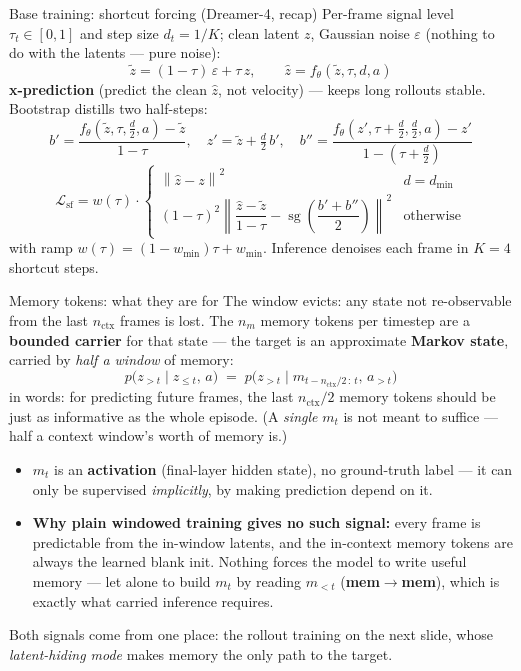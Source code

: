 \documentclass[10pt,aspectratio=169]{beamer}
\newcommand{\sg}{\operatorname{sg}}
\newcommand{\mem}{m}
\begin{document}
\begin{frame}{Base training: shortcut forcing (Dreamer-4, recap)}
Per-frame signal level $\tau_t \in [0,1]$ and step size $d_t = 1/K$; clean latent $z$, Gaussian noise
$\varepsilon$ (nothing to do with the latents --- pure noise):
\[
\tilde z = (1-\tau)\, \varepsilon + \tau\, z, \qquad \hat z = f_\theta(\tilde z, \tau, d, a)
\]
\textbf{x-prediction} (predict the clean $\hat z$, not velocity) --- keeps long rollouts stable. Bootstrap
distills two half-steps:
\[
b' = \frac{f_\theta(\tilde z, \tau, \tfrac{d}{2}, a) - \tilde z}{1-\tau}, \quad
z' = \tilde z + \tfrac{d}{2}\, b', \quad
b'' = \frac{f_\theta(z', \tau{+}\tfrac{d}{2}, \tfrac{d}{2}, a) - z'}{1-(\tau{+}\frac{d}{2})}
\]
\[
\mathcal{L}_{\text{sf}} = w(\tau) \cdot
\begin{cases}
\left\lVert \hat z - z \right\rVert^2 & d = d_{\min}\\[4pt]
(1-\tau)^2 \left\lVert \dfrac{\hat z - \tilde z}{1-\tau} - \sg\!\left(\dfrac{b' + b''}{2}\right) \right\rVert^2 & \text{otherwise}
\end{cases}
\]
with ramp $w(\tau) = (1-w_{\min})\tau + w_{\min}$. Inference denoises each frame in $K{=}4$ shortcut steps.
\end{frame}

\begin{frame}{Memory tokens: what they are for}
The window evicts: any state not re-observable from the last $n_{\text{ctx}}$ frames is lost. The $n_m$
memory tokens per timestep are a \textbf{bounded carrier} for that state --- the target is an approximate
\textbf{Markov state}, carried by \emph{half a window} of memory:
\[
p\big(z_{>t} \mid z_{\le t},\, a\big) \;=\; p\big(z_{>t} \mid \mem_{t-n_{\text{ctx}}/2\,:\,t},\, a_{>t}\big)
\]
in words: for predicting future frames, the last $n_{\text{ctx}}/2$ memory tokens should be just as
informative as the whole episode. (A \emph{single} $\mem_t$ is not meant to suffice --- half a context
window's worth of memory is.)
\medskip
\begin{itemize}
  \item $\mem_t$ is an \textbf{activation} (final-layer hidden state), no ground-truth label --- it can only be
        supervised \emph{implicitly}, by making prediction depend on it.
  \item \textbf{Why plain windowed training gives no such signal:} every frame is predictable from the
        in-window latents, and the in-context memory tokens are always the learned blank init. Nothing forces
        the model to write useful memory --- let alone to build $\mem_t$ by reading $\mem_{<t}$
        (\textbf{mem$\to$mem}), which is exactly what carried inference requires.
\end{itemize}
\medskip
Both signals come from one place: the rollout training on the next slide, whose \emph{latent-hiding mode}
makes memory the only path to the target.
\end{frame}
\end{document}
